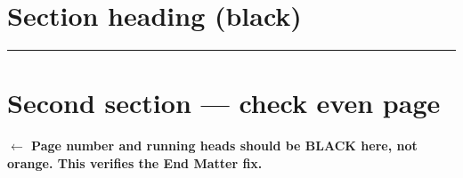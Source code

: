 \documentclass[
  twoside,
  10pt]{book}
\newcommand{\partrule}{%
  \textcolor{partcol}{\rule{\linewidth}{0.8pt}}}
\begin{document}
\section{Section heading (black)}\label{section-heading-black}

\partrule

\lipsum[1-4]

\section{Second section --- check even
page}\label{second-section-check-even-page-4}

\textbf{$\leftarrow$ Page number and running heads should be BLACK here, not orange. This verifies the End Matter fix.}

\lipsum[5-6]


\backmatter
\end{document}
